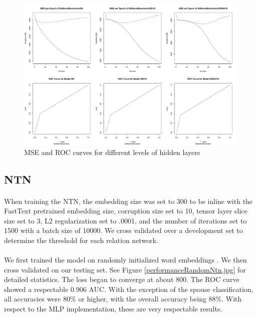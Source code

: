 \documentclass[11.5pt]{article}
\newcounter{Figure}
\newcounter{graphics}
\begin{document}
\begin{figure}[h!]
  \includegraphics[width=1\textwidth]{report_mlp/different_layers_MSE_ROC_2.png}
    \caption{\small MSE and ROC curves for different levels of hidden layers}
    \label{different_layers_MSE_ROC_2.png}
\end{figure}

\subsection{NTN}
\paragraph{} When training the NTN, the embedding size was set to 300 to be inline with the FastText pretrained embedding size, corruption size set to 10, tensor layer slice size set to 3, L2 regularization set to .0001, and the number of iterations set to 1500 with a batch size of 10000. We cross validated over a development set to determine the threshold for each relation network. 

\paragraph{} We first trained the model on randomly initialized word embeddings . We then cross validated on our testing set. See Figure \ref{performanceRandomNtn.jpg} for detailed statistics. The loss began to converge at about 800. The ROC curve showed a respectable 0.906 AUC. With the exception of the spouse classification, all accuracies were 80\% or higher, with the overall accuracy being 88\%. With respect to the MLP implementation, these are very respectable results.
\end{document}

